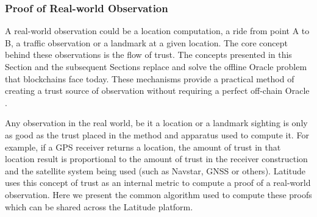 \subsubsection{Proof of Real-world Observation}

A real-world observation could be a location computation, a ride from point A to B, a traffic observation or a landmark
at a given location. The core concept behind these observations is the flow of trust. The concepts presented in this
Section and the subsequent Sections replace and solve the offline Oracle problem that blockchains face today. These
mechanisms provide a practical method of creating a trust source of observation without requiring a perfect off-chain
Oracle \cite{concurrence}.

Any observation in the real world, be it a location or a landmark sighting is only as good as the trust placed in the
method and apparatus used to compute it. For example, if a GPS receiver returns a location, the amount of trust in that
location result is proportional to the amount of trust in the receiver construction and the satellite system being used
(such as Navstar, GNSS or others). Latitude uses this concept of trust as an internal metric to compute a proof of a
real-world observation.  Here we present the common algorithm used to compute these proofs which can be shared across
the Latitude platform.

